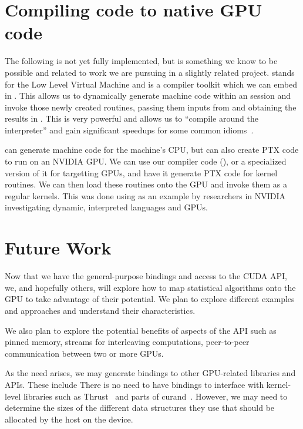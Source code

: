 \documentclass[article]{jss}
\def\R{\proglang{R}}
\def\llvm{\proglang{LLVM}}
\def\Rpkg#1{\pkg{#1}}
\begin{document}
\section[Compiling R code to native GPU code]{Compiling \R{} code to native GPU code}\label{sec:LLVM}
The following is not yet fully implemented, but is something 
we know to be possible and related to work we are pursuing in a
slightly related project.
\llvm{} stands for the Low Level Virtual Machine
and is a compiler toolkit which we can embed in \R. 
This allows us to dynamically generate machine code within an \R{}
session and invoke those newly created routines, passing them 
inputs from \R{} and obtaining the results in \R.
This is very powerful and allows us to ``compile around the \R{}
interpreter'' and gain significant speedups for some common \R{}
idioms~\cite{bib:StatSciLLVM}.

\llvm{} can generate machine code for the machine's CPU, but can also
create PTX code to run on an NVIDIA GPU.  We can use our \R{} compiler
code (\Rpkg{RLLVMCompile}), or a specialized version of it for
targetting GPUs, and have it generate PTX code for kernel routines.
We can then load these routines onto the GPU and invoke them as a
regular kernels.  This was done using \R{} as an example by
researchers in NVIDIA~\cite{bib:libNVVM} investigating dynamic, interpreted
languages and GPUs.

\section{Future Work}

Now that we have the general-purpose bindings and access to the CUDA
API, we, and hopefully others, will explore how to map statistical
algorithms onto the GPU to take advantage of their potential.  We plan
to explore different examples and approaches and understand their
characteristics.  

We also plan to explore the potential benefits of aspects of the API
such as pinned memory, streams for interleaving computations,
peer-to-peer communication between two or more GPUs.

As the need arises, we may generate bindings to other GPU-related
libraries and APIs. These include There is no need to have \R{}
bindings to interface with kernel-level libraries such as
Thrust~\cite{bib:Thrust} and parts of curand~\cite{bib:curand}.
However, we may need to determine the sizes of the different data
structures they use that should be allocated by the host on the
device.



\end{document}

